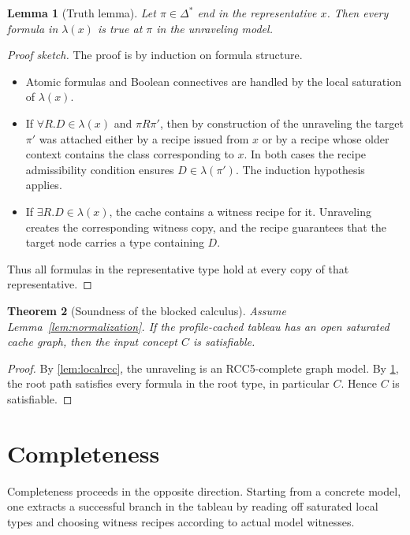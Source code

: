 \documentclass[11pt]{article}
\newtheorem{theorem}{Theorem}[section]
\newtheorem{lemma}[theorem]{Lemma}
\theoremstyle{definition}
\begin{document}
\begin{lemma}[Truth lemma]\label{lem:truth}
Let $\pi\in\Delta^\ast$ end in the representative $x$. Then every formula in $\lambda(x)$ is true at $\pi$ in the unraveling model.
\end{lemma}

\begin{proof}[Proof sketch]
The proof is by induction on formula structure.
\begin{itemize}
  \item Atomic formulas and Boolean connectives are handled by the local saturation of $\lambda(x)$.
  \item If $\forall R.D\in\lambda(x)$ and $\pi R \pi'$, then by construction of the unraveling the target $\pi'$ was attached either by a recipe issued from $x$ or by a recipe whose older context contains the class corresponding to $x$. In both cases the recipe admissibility condition ensures $D\in\lambda(\pi')$. The induction hypothesis applies.
  \item If $\exists R.D\in\lambda(x)$, the cache contains a witness recipe for it. Unraveling creates the corresponding witness copy, and the recipe guarantees that the target node carries a type containing $D$.
\end{itemize}
Thus all formulas in the representative type hold at every copy of that representative.
\end{proof}

\begin{theorem}[Soundness of the blocked calculus]\label{thm:sound}
Assume Lemma~\ref{lem:normalization}. If the profile-cached tableau has an open saturated cache graph, then the input concept $C$ is satisfiable.
\end{theorem}

\begin{proof}
By \cref{lem:localrcc}, the unraveling is an RCC5-complete graph model. By \cref{lem:truth}, the root path satisfies every formula in the root type, in particular $C$. Hence $C$ is satisfiable.
\end{proof}

\section{Completeness}

Completeness proceeds in the opposite direction. Starting from a concrete model, one extracts a successful branch in the tableau by reading off saturated local types and choosing witness recipes according to actual model witnesses.
\end{document}
